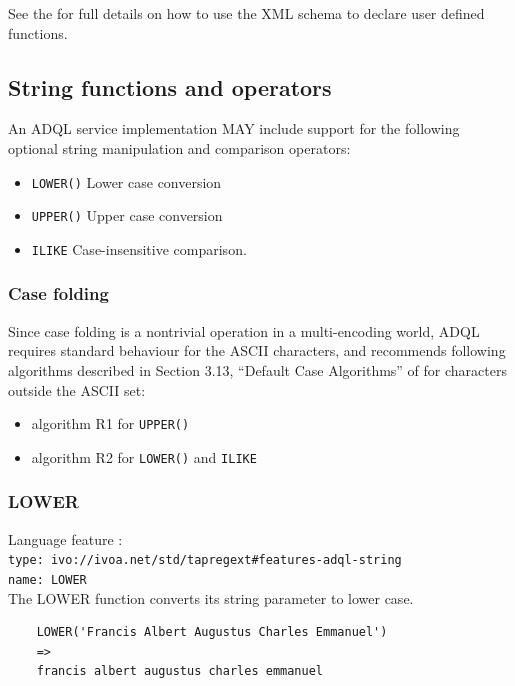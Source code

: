 \documentclass[11pt,a4paper]{ivoa}
\begin{document}
See the \TAPRegSpec{} for full details on how to use the
XML schema to declare user defined functions.

\subsection{String functions and operators}
\label{sec:string.functions}

An ADQL service implementation MAY include support for the following optional
string manipulation and comparison operators:

\begin{itemize}
    \item \verb:LOWER(): Lower case conversion
    \item \verb:UPPER(): Upper case conversion
    \item \verb:ILIKE: Case-insensitive comparison.
\end{itemize}

\subsubsection{Case folding}

Since case folding is a nontrivial operation in a multi-encoding world, ADQL
requires standard behaviour for the ASCII characters, and recommends
following algorithms described in Section 3.13, ``Default Case Algorithms''
of \citet{std:UNICODE} for characters outside the ASCII set:

\begin{itemize}
    \item algorithm R1 for \verb:UPPER():
    \item algorithm R2 for \verb:LOWER(): and \verb:ILIKE:
\end{itemize}

\subsubsection{LOWER}
\label{sec:string.functions.lower}
{\footnotesize Language feature :}\\
{\footnotesize \verb|type: ivo://ivoa.net/std/tapregext#features-adql-string|}\\
{\footnotesize \verb|name: LOWER|}\\

The LOWER function converts its string parameter to lower case.

\begin{verbatim}
    LOWER('Francis Albert Augustus Charles Emmanuel')
    =>
    francis albert augustus charles emmanuel
\end{verbatim}
\end{document}
